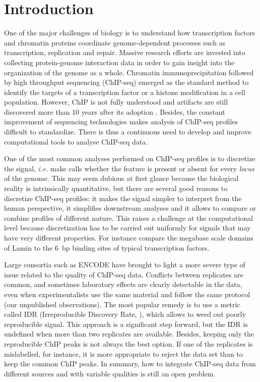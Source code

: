 \documentclass{bioinfo}
\begin{document}
\section{Introduction}
One of the major challenges of biology is to understand how transcription
factors and chromatin proteins coordinate genome-dependent processes
such as transcription, replication and repair. Massive research efforts
are invested into collecting protein-genome interaction data in order
to gain insight into the organization of the genome as a whole. Chromatin
immunoprecipitation followed by high throughput sequencing (ChIP-seq)
emerged as the standard method to identify the targets of a transcription
factor or a histone modification in a cell population. However, ChIP is not
fully understood and artifacts are still discovered more than 10 years after
its adoption \citep{pmid24349523, pmid24173036}. Besides, the constant
improvement of sequencing technologies makes analysis of ChIP-seq profiles
difficult to standardize. There is thus a continuous need to develop and
improve computational tools to analyse ChIP-seq data.

One of the most common analyses performed on ChIP-seq profiles is to
discretize the signal, \textit{i.e.} make calls whether the feature is
present or absent for every \textit{locus} of the genome. This may seem
dubious at first glance because the biological reality is intrinsically
quantitative, but there are several good reasons to discretize ChIP-seq
profiles: it makes the signal simpler to interpret from the human
perspective, it simplifies downstream analyses and it allows to compare or
combine profiles of different nature. This raises a challenge at the
computational level because discretization has to be carried out uniformly
for signals that may have very different properties. For instance compare
the megabase scale domains of Lamin \citep{pmid18463634} to the 6~bp
binding sites of typical transcription factors.

Large consortia such as ENCODE have brought to light a more severe type
of issue related to the quality of ChIP-seq data. Conflicts between
replicates are common, and
sometimes laboratory effects are clearly detectable in the data,
even when experimentalists use the same material and follow the same
protocol (our unpublished observations). The most popular remedy is to
use a metric called IDR (Irreproducible Discovery Rate, \citealp{li2011}),
which allows to weed
out poorly reproducible signal. This approach is a significant step
forward, but the IDR is undefined when more than two replicates are
available. Besides, keeping only the reproducible ChIP peaks is not
always the best option. If one of the replicates is mislabelled,
for instance, it is more appropriate to reject the data set than to keep
the common ChIP peaks. In summary, how to integrate ChIP-seq data
from different sources and with variable qualities is still an open
problem.
\end{document}
